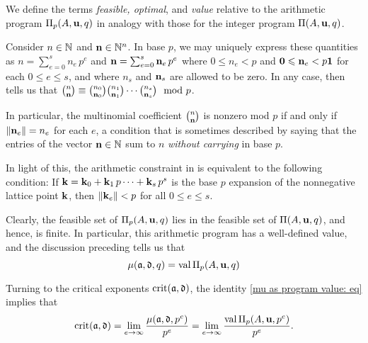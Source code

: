 \documentclass[11pt]{amsart}
\begin{document}
We define the terms \emph{feasible, optimal}, and \emph{value} relative to the arithmetic program $\Pi_p(A, \mathbf{u}, q)$ in analogy with those for the integer program $\Pi(A, \mathbf{u}, q)$.


\begin{remark}
 \label{dickson: R}
   Consider $n \in \mathbb{N}$ and $\mathbf{n} \in \mathbb{N}^n$.
   In base $p$, we may uniquely express these quantities as $n= \sum_{e=0}^s n_e \, p^e$ and $\mathbf{n}=\sum_{e=0}^s \mathbf{n}_e \, p^e$
where $0\le n_e < p$ and $\mathbf{0}\leqslant\mathbf{n}_e < p  \mathbf{1}$ for each $0 \leq e \leq s$, and where $n_s$ and $\mathbf{n}_s$ are allowed to be zero.
In any case, \cite{dickson.multinomial} then tells us that
$\binom{n}{\mathbf{n}}\equiv \binom{n_0}{\mathbf{n}_0}\binom{n_1}{\mathbf{n}_1}\cdots \binom{n_s}{\mathbf{n}_s} \mod{p}$.

In particular, the multinomial coefficient $\binom{n}{\mathbf{n}}$ is nonzero mod $p$ if and only if $\| \mathbf{n}_e \|=n_e$ for each $e$, a condition that is sometimes described by saying that the entries of the vector $\mathbf{n} \in \mathbb{N}$ sum to $n$ \emph{without carrying} in base $p$.

In light of this, the arithmetic constraint in  is equivalent to the following condition:  If
 $\mathbf{k} = \mathbf{k}_0 + \mathbf{k}_1 \, p\cdots + \mathbf{k}_s \, p^s$ is the base $p$ expansion of the nonnegative lattice point $\mathbf{k}$, then $\| \mathbf{k}_e \| < p$ for all $0 \leq e \leq s$.
\end{remark}

Clearly, the feasible set of $\Pi_p(A, \mathbf{u}, q)$ lies in the feasible set of $\Pi(A, \mathbf{u},q)$, and hence, is finite.  
In particular, this arithmetic program has a well-defined value, and the discussion preceding  tells us that
%
\begin{equation}
\label{mu as program value: eq}
\mu(\mathfrak{a},\mathfrak{d},q) = \operatorname{val} \Pi_p(A,\mathbf{u},q)
\end{equation}
%

Turning to the critical exponents $\operatorname{crit}(\mathfrak{a}, \mathfrak{d})$, the identity \eqref{mu as program value: eq} implies that
%
\begin{equation}
\label{crit as limit of normalized program values: eq}
\operatorname{crit}(\mathfrak{a},\mathfrak{d}) = \lim_{e\to\infty} \frac{\mu(\mathfrak{a},\mathfrak{d},p^e)}{p^e} = \lim_{e\to\infty} \frac{\operatorname{val} \Pi_p(A,\mathbf{u},p^e)}{p^e}.
\end{equation}
%
\end{document}
